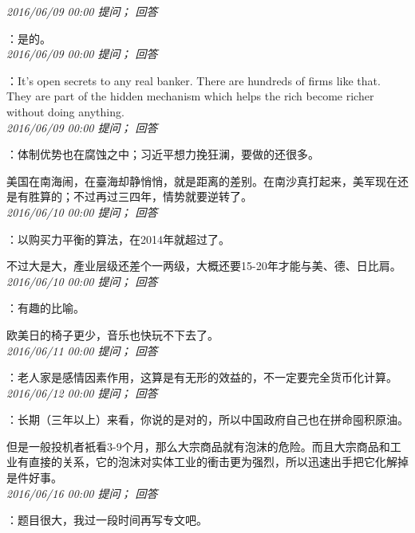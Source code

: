 \documentclass[twocolumn]{ctexart}
\begin{document}
\textit{\hfill\noindent\small 2016/06/09 00:00 提问； 回答}

：是的。\\

\textit{\hfill\noindent\small 2016/06/09 00:00 提问； 回答}

：It's open secrets to any real banker. There are hundreds of firms like that. They are part of the hidden mechanism which helps the rich become richer without doing anything.\\

\textit{\hfill\noindent\small 2016/06/09 00:00 提问； 回答}

：体制优势也在腐蚀之中；习近平想力挽狂澜，要做的还很多。

美国在南海闹，在臺海却静悄悄，就是距离的差别。在南沙真打起来，美军现在还是有胜算的；不过再过三四年，情势就要逆转了。\\

\textit{\hfill\noindent\small 2016/06/10 00:00 提问； 回答}

：以购买力平衡的算法，在2014年就超过了。

不过大是大，產业层级还差个一两级，大概还要15-20年才能与美、德、日比肩。\\

\textit{\hfill\noindent\small 2016/06/10 00:00 提问； 回答}

：有趣的比喻。

欧美日的椅子更少，音乐也快玩不下去了。\\

\textit{\hfill\noindent\small 2016/06/11 00:00 提问； 回答}

：老人家是感情因素作用，这算是有无形的效益的，不一定要完全货币化计算。\\

\textit{\hfill\noindent\small 2016/06/12 00:00 提问； 回答}

：长期（三年以上）来看，你说的是对的，所以中国政府自己也在拼命囤积原油。

但是一般投机者衹看3-9个月，那么大宗商品就有泡沫的危险。而且大宗商品和工业有直接的关系，它的泡沫对实体工业的衝击更为强烈，所以迅速出手把它化解掉是件好事。\\

\textit{\hfill\noindent\small 2016/06/16 00:00 提问； 回答}

：题目很大，我过一段时间再写专文吧。
\end{document}
